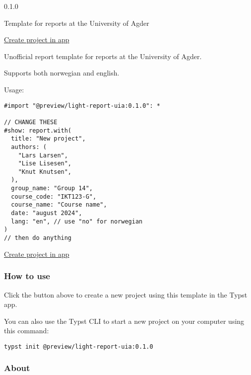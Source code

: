 { 0.1.0 }

Template for reports at the University of Agder

\href{/app?template=light-report-uia&version=0.1.0}{Create project in
app}

\label{readme}
Unofficial report template for reports at the University of Agder.

Supports both norwegian and english.

Usage:

\begin{verbatim}
#import "@preview/light-report-uia:0.1.0": *

// CHANGE THESE
#show: report.with(
  title: "New project",
  authors: (
    "Lars Larsen",
    "Lise Lisesen",
    "Knut Knutsen",
  ),
  group_name: "Group 14",
  course_code: "IKT123-G",
  course_name: "Course name",
  date: "august 2024",
  lang: "en", // use "no" for norwegian
)
// then do anything
\end{verbatim}

\href{/app?template=light-report-uia&version=0.1.0}{Create project in
app}

\subsubsection{How to use}\label{how-to-use}

Click the button above to create a new project using this template in
the Typst app.

You can also use the Typst CLI to start a new project on your computer
using this command:

\begin{verbatim}
typst init @preview/light-report-uia:0.1.0
\end{verbatim}



\subsubsection{About}\label{about}

